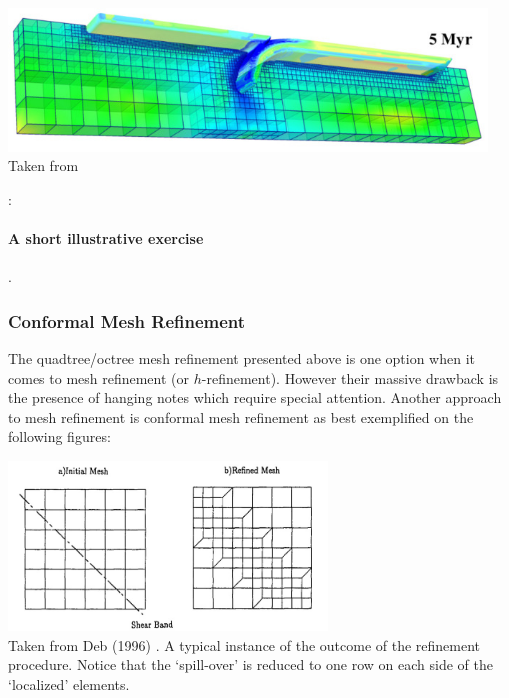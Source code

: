 \begin{center}
\includegraphics[height=3.8cm]{images/meshes/gltf18.jpg}\\
{\captionfont Taken from \cite{gltf18}}
\end{center}


\Literature: \cite{bugg08,bugg10}\cite{lezh11} \cite[sect 3]{bugs09} \cite{dadh07}
\cite{svna18} \cite{mish11}


\newpage
\paragraph{A short illustrative exercise}.




\subsubsection{Conformal Mesh Refinement}

The quadtree/octree mesh refinement presented above is one option
when it comes to mesh refinement (or $h$-refinement). However their 
massive drawback is the presence of hanging notes which require 
special attention. 
Another approach to mesh refinement is conformal mesh refinement
as best exemplified on the following figures: 

\begin{center}
\includegraphics[height=4.5cm]{images/meshes/amrnew}\\
{\captionfont Taken from Deb \etal (1996) \cite{depl96}.
A typical instance of the outcome of the refinement procedure. 
Notice that the ‘spill-over’ is reduced to one row on each side of the ‘localized’ elements.}
\end{center}


